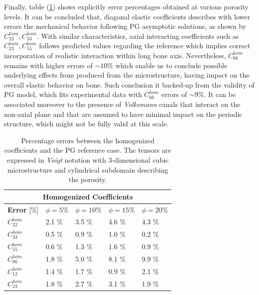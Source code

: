 Finally, table (\ref{Hom3dCoeffSquareTable}) shows explicitly error percentages obtained at various porosity levels. It can be concluded that, diagonal elastic coefficients describes with lower errors the mechanical behavior following PG asymptotic solutions, as shown by $C_{22}^{hom}, C_{33}^{hom}$. With similar characteristics, axial interacting coefficients such as $C_{23}^{hom}, C_{55}^{hom}$ follows predicted values regarding the reference which implies correct incorporation of realistic interaction within long bone axis. Nevertheless, $C_{66}^{hom}$ remains with higher errors of $\sim 10 \%$ which enable us to conclude possible underlying effects from produced from the microstructure, having impact on the overall elastic behavior on bone. Such conclusion it backed-up from the validity of PG model, which fits experimental data with $C_{66}^{hom}$ errors of $\sim 9 \%$. It can be associated moreover to the presence of \textit{Volksmann} canals that interact on the non-axial plane and that are assumed to have minimal impact on the periodic structure, which might not be fully valid at this scale.

\begin{table}[!h]
\centering
    \begin{tabular}{ |p{2.2cm}||p{2cm}|p{2cm}|p{2cm}|p{2cm}| }
    \hline
    \multicolumn{5}{|c|}{\textbf{Homogenized Coefficients}} \\
    \hline
    \textbf{Error} [\%] & $\phi = 5 \%$ & $\phi = 10 \%$ & $\phi = 15 \%$ & $\phi = 20 \%$ \\
    \hline
    $C^{hom}_{22}$ & 2.1 \% & 3.5 \% & 4.6 \% & 4.3 \% \\
    $C^{hom}_{33}$ & 0.5 \% & 0.9 \% & 1.0 \% & 0.2 \% \\
    $C^{hom}_{55}$ & 0.6 \% & 1.3 \% & 1.6 \% & 0.9 \% \\
    $C^{hom}_{66}$ & 1.8 \% & 5.0 \% & 8.1 \% & 9.9 \% \\
    $C^{hom}_{12}$ & 1.4 \% & 1.7 \% & 0.9 \% & 2.1 \% \\
    $C^{hom}_{23}$ & 1.8 \% & 2.7 \% & 3.1 \% & 1.9 \% \\
    \hline
    \end{tabular}
    \caption{Percentage errors between the homogenized coefficients and the PG reference case. The tensors are expressed in \textit{Voigt} notation with 3-dimensional cubic microstructure and cylindrical subdomain describing the porosity.}
    \label{Hom3dCoeffSquareTable}
\end{table}

